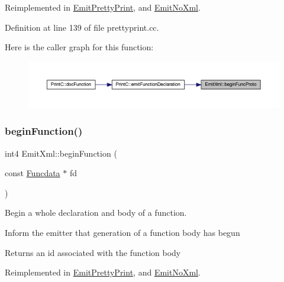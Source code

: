 Reimplemented in \mbox{\hyperlink{class_emit_pretty_print_a242bc11dbb30efeb41f7e4ad39169450}{Emit\+Pretty\+Print}}, and \mbox{\hyperlink{class_emit_no_xml_a3ae360f835420fdb0972a9d883012252}{Emit\+No\+Xml}}.



Definition at line 139 of file prettyprint.\+cc.

Here is the caller graph for this function\+:
\nopagebreak
\begin{figure}[H]
\begin{center}
\leavevmode
\includegraphics[width=350pt]{class_emit_xml_acaf7a29dd1eb427f20e99dccf3581f59_icgraph}
\end{center}
\end{figure}
\mbox{\label{class_emit_xml_acff5f33b9ab6a4a036688160c98c0aa9}} 
\subsubsection{\texorpdfstring{beginFunction()}{beginFunction()}}
{\footnotesize\ttfamily int4 Emit\+Xml\+::begin\+Function (\begin{DoxyParamCaption}\item[{const \mbox{\hyperlink{class_funcdata}{Funcdata}} $\ast$}]{fd }\end{DoxyParamCaption})\hspace{0.3cm}{\ttfamily [virtual]}}



Begin a whole declaration and body of a function. 

Inform the emitter that generation of a function body has begun \begin{DoxyReturn}{Returns}
an id associated with the function body 
\end{DoxyReturn}


Reimplemented in \mbox{\hyperlink{class_emit_pretty_print_afc7d7ad8e92e3aebb5098ab3aa90153d}{Emit\+Pretty\+Print}}, and \mbox{\hyperlink{class_emit_no_xml_ad06515c4f61b81ee45404871780e17a0}{Emit\+No\+Xml}}.



